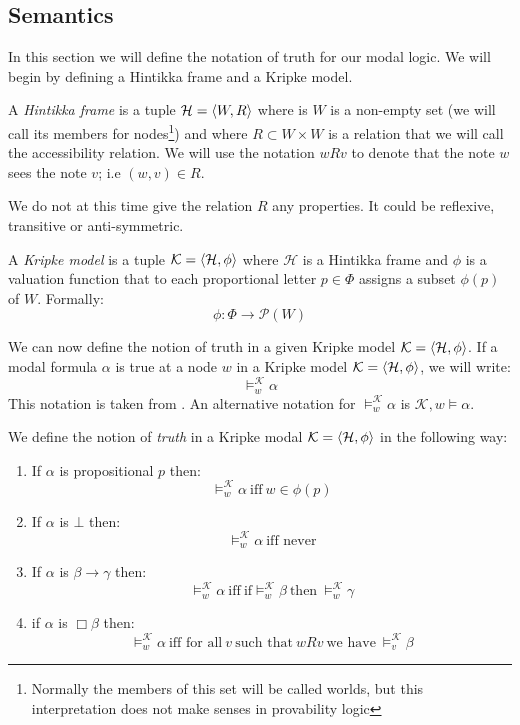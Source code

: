 \documentclass[../main.tex]{subfiles}
\begin{document}
\subsection{Semantics}
In this section we will define the notation of truth for our modal logic. We
will begin by defining a Hintikka frame and a Kripke model.
\begin{defi}
	A \textit{Hintikka frame} is a tuple $\mathcal{H}=\langle W,R\rangle$ where is $W$ is
	a non-empty set (we will call its members for nodes\footnote{Normally
		the members of this set will be called worlds, but this
	interpretation does not make senses in provability logic}) and where $R\subset
	W\times W$ is a relation that we will call the accessibility relation.
	We will use the notation $wRv$ to denote that the note $w$ sees the note
	$v$; i.e $(w,v)\in R$.
\end{defi}
We do not at this time give the relation $R$ any properties. It could be
reflexive, transitive or anti-symmetric.
\begin{defi}
	A \textit{Kripke model} is a tuple $\mathcal{K}=\langle \mathcal{H},\phi\rangle$ where
	$\mathcal{H}$ is a Hintikka frame and $\phi$ is a valuation function that to
	each proportional letter $p\in \Phi$ assigns a subset $\phi(p)$ of $W$.
	Formally:
	\[\phi:\Phi\rightarrow\mathcal{P}(W)\]
\end{defi}
We can now define the notion of truth in a given Kripke model $\mathcal{K}=\langle
\mathcal{H},\phi\rangle$. If a modal formula $\alpha$ is true at a node $w$ in a
Kripke model $\mathcal{K}=\langle \mathcal{H},\phi\rangle$, we will write:
\[\vDash_w^\mathcal{K}\alpha\]
This notation is taken from \parencite{Lemmon1977}. An alternative notation for
$\vDash^\mathcal{K}_w\alpha$ is $\mathcal{K},w\vDash\alpha$.
\begin{defi}
	We define the notion of \textit{truth} in a Kripke modal $\mathcal{K}=\langle
	\mathcal{H},\phi\rangle$ in the
	following way:
	\begin{enumerate}
		\item If $\alpha$ is propositional $p$ then:
			\[\vDash_w^\mathcal{K}\alpha\ \text{iff}\ w\in\phi(p)\]
		\item If $\alpha$ is $\bot$ then:
			\[\vDash_w^\mathcal{K}\alpha\ \text{iff never} \]
		\item If $\alpha$ is $\beta\rightarrow\gamma$ then:
			\[\vDash_w^\mathcal{K}\alpha\ \text{iff}\ \text{if}
				\vDash_w^\mathcal{K}\beta\ \text{then}\
			\vDash_w^\mathcal{K}\gamma\]
		\item if $\alpha$ is $\Box\beta$ then:
			\[\vDash_w^\mathcal{K}\alpha\ \text{iff for all}\ v\
				\text{such that}\ wRv\ \text{we have}\
			\vDash_v^\mathcal{K}\beta\]
	\end{enumerate}
\end{defi}
\end{document}
